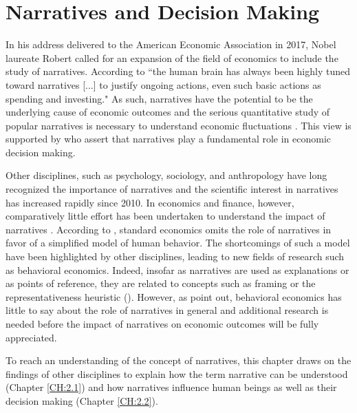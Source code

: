 \documentclass[11pt,a4paper,english,oneside]{book}
\numberwithin{equation}{chapter}
\begin{document}
\chapter{Narratives and Decision Making}\label{NarrativesAndDecisionMaking}

In his address delivered to the American Economic Association in 2017, Nobel laureate Robert \citeauthor{Shiller.2017} called for an expansion of the field of economics to include the study of narratives. According to \citet[p. 967]{Shiller.2017} ``the human brain has always been highly tuned
toward narratives [...] to justify ongoing actions, even such basic actions as spending and investing." As such, narratives have the potential to be the underlying cause of economic outcomes and the serious quantitative study of popular narratives is necessary to understand economic fluctuations \cite[p. 967]{Shiller.2017}. This view is supported by \citet{Akerlof.2016} who assert that narratives play a fundamental role in economic decision making.

Other disciplines, such as psychology, sociology, and anthropology have long recognized the importance of narratives and the scientific interest in narratives has increased rapidly since 2010. In economics and finance, however, comparatively little effort has been undertaken to understand the impact of narratives \cite[pp. 969--970]{Shiller.2017}. According to \citet[p. 59]{Akerlof.2016}, standard economics omits the role of narratives in favor of a simplified model of human behavior. The shortcomings of such a model have been highlighted by other disciplines, leading to new fields of research such as behavioral economics. Indeed, insofar as narratives are used as explanations or as points of reference, they are related to concepts such as framing or the representativeness heuristic (\citealp{Kahnemann.1974,Kahneman.2002,Thaler.2016}). However, as \citet[p. 59]{Akerlof.2016} point out, behavioral economics has little to say about the role of narratives in general and additional research is needed before the impact of narratives on economic outcomes will be fully appreciated. 

To reach an understanding of the concept of narratives, this chapter draws on the findings of other disciplines to explain how the term narrative can be understood (Chapter \ref{CH:2.1}) and how narratives influence human beings as well as their decision making (Chapter \ref{CH:2.2}). 


\end{document}

